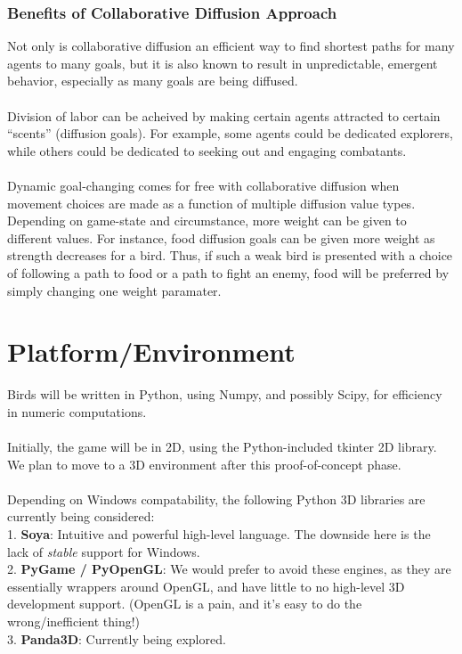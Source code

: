 \documentclass{article}
\begin{document}
\subsubsection*{Benefits of Collaborative Diffusion Approach}
Not only is collaborative diffusion an efficient way to find shortest paths for many agents to many goals, but it is also known to result in unpredictable, emergent behavior, especially as many goals are being diffused.
\\\\
Division of labor can be acheived by making certain agents attracted to certain ``scents'' (diffusion goals).  For example, some agents could be dedicated explorers, while others could be dedicated to seeking out and engaging combatants.
\\\\
Dynamic goal-changing comes for free with collaborative diffusion when movement choices are made as a function of multiple diffusion value types.  Depending on game-state and circumstance, more weight can be given to different values.  For instance, food diffusion goals can be given more weight as strength decreases for a bird.  Thus, if such a weak bird is presented with a choice of following a path to food or a path to fight an enemy, food will be preferred by simply changing one weight paramater.

\section*{Platform/Environment}
Birds will be written in Python, using Numpy, and possibly Scipy, for efficiency in numeric computations.
\\\\
Initially, the game will be in 2D, using the Python-included tkinter 2D library.  We plan to move to a 3D environment after this proof-of-concept phase.\\\\
Depending on Windows compatability, the following Python 3D libraries are currently being considered:\\
1.  \textbf{Soya}: Intuitive and powerful high-level language.  The downside here is the lack of \textit{stable} support for Windows.\\
2.  \textbf{PyGame / PyOpenGL}: We would prefer to avoid these engines, as they are essentially wrappers around OpenGL, and have little to no high-level 3D development support. (OpenGL is a pain, and it's easy to do the wrong/inefficient thing!)\\
3.  \textbf{Panda3D}: Currently being explored.\\
\end{document}
